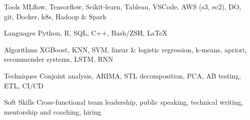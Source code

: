

\begin{cvskills}

  \cvskill
    {Tools} %
    {MLflow, Tensorflow, Scikit-learn, Tableau, VSCode, AWS (s3, ec2), DO, git, Docker, k8s, Hadoop \& Spark} %

  \cvskill
    {Languages} %
    {Python, R, SQL, C++, Bash/ZSH, {\LaTeX{}}} %

  \cvskill
    {Algorithms} %
    {XGBoost, KNN, SVM, linear \& logistic regression, k-means, apriori, recommender systems, LSTM, RNN} %

  \cvskill
    {Techniques} %
    {Conjoint analysis, ARIMA, STL decomposition, PCA, AB testing, ETL, CI/CD} %

  \cvskill
    {Soft Skills} %
    {Cross-functional team leadership, public speaking, technical writing, mentorship and coaching, hiring} %

\end{cvskills}
